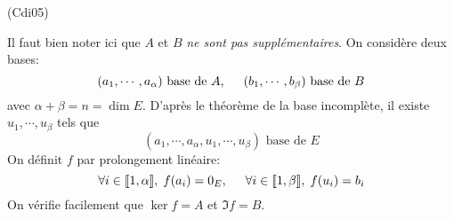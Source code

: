 \begin{tiny}(Cdi05)\end{tiny} Il faut bien noter ici que $A$ et $B$ \emph{ne sont pas supplémentaires}. On considère deux bases:
\begin{displaymath}
  (a_1,\cdots,a_\alpha) \text{ base de } A, \hspace{0.5cm}
  (b_1,\cdots,b_\beta) \text{ base de } B
\end{displaymath}
avec $\alpha + \beta = n = \dim E$. D'après le théorème de la base incomplète, il existe $u_1,\cdots, u_\beta$ tels que
\begin{displaymath}
  (a_1,\cdots,a_\alpha, u_1,\cdots, u_\beta) \text{ base de } E
\end{displaymath}
On définit $f$ par prolongement linéaire:
\begin{displaymath}
\forall i\in \llbracket 1,\alpha\rrbracket,\; f(a_i)=0_E,\hspace{0.5cm}
\forall i\in \llbracket 1,\beta\rrbracket,\; f(u_i)= b_i
\end{displaymath}
On vérifie facilement que $\ker f = A$ et $\Im f = B$.